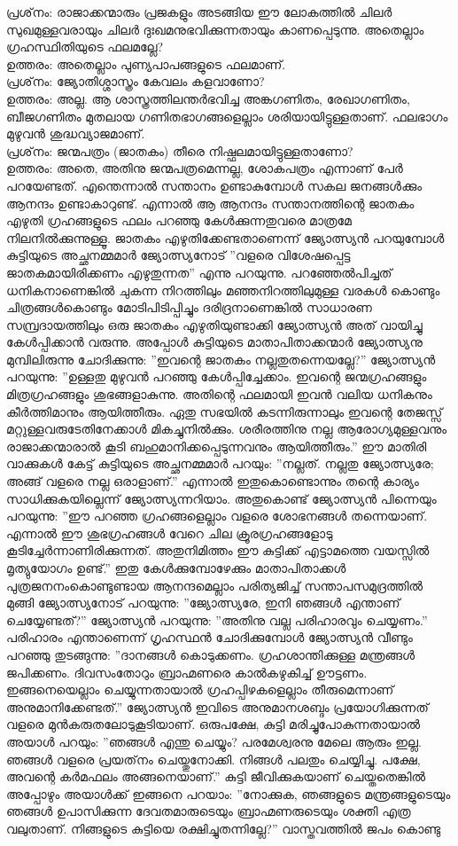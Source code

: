 പ്രശ്‌നം: രാജാക്കന്മാരും പ്രജകളും അടങ്ങിയ ഈ ലോകത്തില്‍ ചിലര്‍ സുഖമുള്ളവരായും ചിലര്‍ ദുഃഖമനുഭവിക്കുന്നതായും കാണപ്പെടുന്നു. അതെല്ലാം ഗ്രഹസ്ഥിതിയുടെ ഫലമല്ലേ?\\
ഉത്തരം: അതെല്ലാം പുണ്യപാപങ്ങളുടെ ഫലമാണ്.\\
പ്രശ്‌നം: ജ്യോതിശ്ശാസ്ത്രം കേവലം കളവാണോ?\\
ഉത്തരം: അല്ല. ആ ശാസ്ത്രത്തിലന്തര്‍ഭവിച്ച അങ്കഗണിതം, രേഖാഗണിതം, ബീജഗണിതം മുതലായ ഗണിതഭാഗങ്ങളെല്ലാം ശരിയായിട്ടുള്ളതാണ്. ഫലഭാഗം മുഴുവന്‍ ശുദ്ധവ്യാജമാണ്.\\
പ്രശ്‌നം: ജന്മപത്രം (ജാതകം) തീരെ നിഷ്ഫലമായിട്ടുള്ളതാണോ?\\
ഉത്തരം: അതെ, അതിനു ജന്മപത്രമെന്നല്ല, ശോകപത്രം എന്നാണ് പേര്‍ പറയേണ്ടത്. എന്തെന്നാല്‍ സന്താനം ഉണ്ടാകുമ്പോള്‍ സകല ജനങ്ങള്‍ക്കും ആനന്ദം ഉണ്ടാകാറുണ്ട്. എന്നാല്‍ ആ ആനന്ദം സന്താനത്തിന്റെ ജാതകം എഴുതി ഗ്രഹങ്ങളുടെ ഫലം പറഞ്ഞു കേള്‍ക്കുന്നതുവരെ മാത്രമേ നിലനില്‍ക്കുന്നുള്ളൂ. ജാതകം എഴുതിക്കേണ്ടതാണെന്ന് ജ്യോത്സ്യന്‍ പറയുമ്പോള്‍ കുട്ടിയുടെ അച്ഛനമ്മമാര്‍ ജ്യോത്സ്യനോട് ''വളരെ വിശേഷപ്പെട്ട ജാതകമായിരിക്കണം എഴുതുന്നത'' എന്നു പറയുന്നു. പറഞ്ഞേല്‍പിച്ചത് ധനികനാണെങ്കില്‍ ചുകന്ന നിറത്തിലും മഞ്ഞനിറത്തിലുമുള്ള വരകള്‍ കൊണ്ടും ചിത്രങ്ങള്‍കൊണ്ടും മോടിപിടിപ്പിച്ചും ദരിദ്രനാണെങ്കില്‍ സാധാരണ സമ്പ്രദായത്തിലും ഒരു ജാതകം എഴുതിയുണ്ടാക്കി ജ്യോത്സ്യന്‍ അത് വായിച്ചു കേള്‍പ്പിക്കാന്‍ വരുന്നു. അപ്പോള്‍ കുട്ടിയുടെ മാതാപിതാക്കന്മാര്‍ ജ്യോത്സ്യനു മുമ്പിലിരുന്നു ചോദിക്കുന്നു: ''ഇവന്റെ ജാതകം നല്ലതുതന്നെയല്ലേ?'' ജ്യോത്സ്യന്‍ പറയുന്നു: ''ഉള്ളതു മുഴുവന്‍ പറഞ്ഞു കേള്‍പ്പിച്ചേക്കാം. ഇവന്റെ ജന്മഗ്രഹങ്ങളും മിത്രഗ്രഹങ്ങളും ശുഭങ്ങളാകുന്നു. അതിന്റെ ഫലമായി ഇവന്‍ വലിയ ധനികനും കീര്‍ത്തിമാനും ആയിത്തീരും. ഏതു സഭയില്‍ കടന്നിരുന്നാലും ഇവന്റെ തേജസ്സ് മറ്റുള്ളവരുടേതിനേക്കാള്‍ മികച്ചുനില്‍ക്കും. ശരീരത്തിനു നല്ല ആരോഗ്യമുള്ളവനും രാജാക്കന്മാരാല്‍ കൂടി ബഹുമാനിക്കപ്പെടുന്നവനും ആയിത്തീരും.'' ഈ മാതിരി വാക്കുകള്‍ കേട്ട് കുട്ടിയുടെ അച്ഛനമ്മമാര്‍ പറയും: ''നല്ലത്. നല്ലതു ജ്യോത്സ്യരേ; അങ്ങ് വളരെ നല്ല ഒരാളാണ്.'' എന്നാല്‍ ഇതുകൊണ്ടൊന്നും തന്റെ കാര്യം സാധിക്കുകയില്ലെന്ന് ജ്യോത്സ്യന്നറിയാം. അതുകൊണ്ട് ജ്യോത്സ്യന്‍ പിന്നെയും പറയുന്നു: ''ഈ പറഞ്ഞ ഗ്രഹങ്ങളെല്ലാം വളരെ ശോഭനങ്ങള്‍ തന്നെയാണ്. എന്നാല്‍ ഈ ശുഭഗ്രഹങ്ങള്‍ വേറെ ചില ക്രൂരഗ്രഹങ്ങളോടു കൂടിച്ചേര്‍ന്നാണിരിക്കുന്നത്. അതുനിമിത്തം ഈ കുട്ടിക്ക് എട്ടാമത്തെ വയസ്സില്‍ മൃത്യുയോഗം ഉണ്ട്.'' ഇതു കേള്‍ക്കുമ്പോഴേക്കും മാതാപിതാക്കള്‍ പുത്രജനനംകൊണ്ടുണ്ടായ ആനന്ദമെല്ലാം പരിത്യജിച്ച് സന്താപസമുദ്രത്തില്‍ മുങ്ങി ജ്യോത്സ്യനോട് പറയുന്നു: ''ജ്യോത്സ്യരേ, ഇനി ഞങ്ങള്‍ എന്താണ് ചെയ്യേണ്ടത്?'' ജ്യോത്സ്യന്‍ പറയുന്നു: ''അതിനു വല്ല പരിഹാരവും ചെയ്യണം.'' പരിഹാരം എന്താണെന്ന് ഗൃഹസ്ഥന്‍ ചോദിക്കുമ്പോള്‍ ജ്യോത്സ്യന്‍ വീണ്ടും പറഞ്ഞു തുടങ്ങുന്നു: ''ദാനങ്ങള്‍ കൊടുക്കണം. ഗ്രഹശാന്തിക്കുള്ള മന്ത്രങ്ങള്‍ ജപിക്കണം. ദിവസംതോറും ബ്രാഹ്മണരെ കാല്‍കഴുകിച്ച് ഊട്ടണം. ഇങ്ങനെയെല്ലാം ചെയ്യുന്നതായാല്‍ ഗ്രഹപ്പിഴകളെല്ലാം തീരുമെന്നാണ് അനുമാനിക്കേണ്ടത്.'' ജ്യോത്സ്യന്‍ ഇവിടെ അനുമാനശബ്ദം പ്രയോഗിക്കുന്നത് വളരെ മുന്‍കരുതലോടുകൂടിയാണ്. ഒരുപക്ഷേ, കുട്ടി മരിച്ചുപോകുന്നതായാല്‍ അയാള്‍ പറയും: ''ഞങ്ങള്‍ എന്തു ചെയ്യും? പരമേശ്വരനു മേലെ ആരും ഇല്ല. ഞങ്ങള്‍ വളരെ പ്രയത്‌നം ചെയ്തുനോക്കി. നിങ്ങള്‍ പലതും ചെയ്യിച്ചു. പക്ഷേ, അവന്റെ കര്‍മഫലം അങ്ങനെയാണ്.'' കുട്ടി ജീവിക്കുകയാണ് ചെയ്തതെങ്കില്‍ അപ്പോഴും അയാള്‍ക്ക് ഇങ്ങനെ പറയാം: ''നോക്കുക, ഞങ്ങളുടെ മന്ത്രങ്ങളുടെയും ഞങ്ങള്‍ ഉപാസിക്കുന്ന ദേവതമാരുടെയും ബ്രാഹ്മണരുടെയും ശക്തി എത്ര വലുതാണ്. നിങ്ങളുടെ കുട്ടിയെ രക്ഷിച്ചുതന്നില്ലേ?'' വാസ്തവത്തില്‍ ജപം കൊണ്ടു 